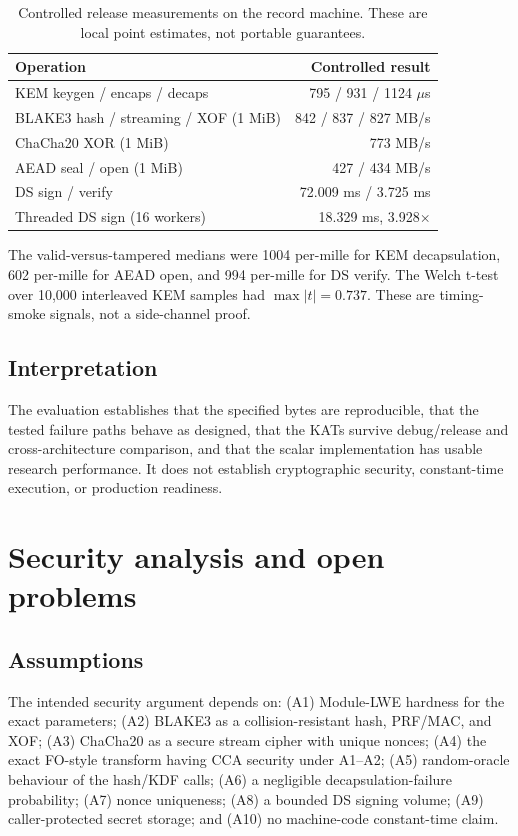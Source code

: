 \documentclass[11pt,a4paper]{article}
\theoremstyle{plain}
\theoremstyle{definition}
\theoremstyle{remark}
\begin{document}
\begin{table}[t]
\centering
\small
\begin{tabular}{@{}lr@{}}
\toprule
Operation & Controlled result \\
\midrule
KEM keygen / encaps / decaps & 795 / 931 / 1124 $\mu$s \\
BLAKE3 hash / streaming / XOF (1 MiB) & 842 / 837 / 827 MB/s \\
ChaCha20 XOR (1 MiB) & 773 MB/s \\
AEAD seal / open (1 MiB) & 427 / 434 MB/s \\
DS sign / verify & 72.009 ms / 3.725 ms \\
Threaded DS sign (16 workers) & 18.329 ms, 3.928$\times$ \\
\bottomrule
\end{tabular}
\caption{Controlled release measurements on the record machine.
These are local point estimates, not portable guarantees.}
\label{tab:bench}
\end{table}

The valid-versus-tampered medians were 1004 per-mille for KEM
decapsulation, 602 per-mille for AEAD open, and 994 per-mille for DS
verify.  The Welch t-test over 10,000 interleaved KEM samples had
$\max |t|=0.737$.  These are timing-smoke signals, not a side-channel
proof.

\subsection{Interpretation}

The evaluation establishes that the specified bytes are reproducible,
that the tested failure paths behave as designed, that the KATs survive
debug/release and cross-architecture comparison, and that the scalar
implementation has usable research performance.  It does not establish
cryptographic security, constant-time execution, or production
readiness.

\section{Security analysis and open problems}
\label{sec:security}

\subsection{Assumptions}

The intended security argument depends on: (A1) Module-LWE hardness for
the exact parameters; (A2) BLAKE3 as a collision-resistant hash,
PRF/MAC, and XOF; (A3) ChaCha20 as a secure stream cipher with unique
nonces; (A4) the exact FO-style transform having CCA security under
A1--A2; (A5) random-oracle behaviour of the hash/KDF calls; (A6) a
negligible decapsulation-failure probability; (A7) nonce uniqueness;
(A8) a bounded DS signing volume; (A9) caller-protected secret storage;
and (A10) no machine-code constant-time claim.
\end{document}
